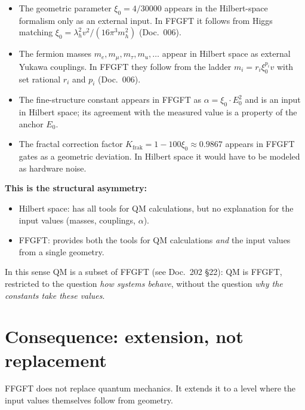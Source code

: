 \begin{itemize}[leftmargin=2em,itemsep=2pt,topsep=2pt]
  \item The geometric parameter $\xi_0 = 4/30000$ appears in the
        Hilbert-space formalism only as an external input. In FFGFT
        it follows from Higgs matching $\xi_0 = \lambda_h^2 v^2/
        (16\pi^3 m_h^2)$ (Doc.~006).
  \item The fermion masses $m_e, m_\mu, m_\tau, m_u, \ldots$ appear
        in Hilbert space as external Yukawa couplings. In FFGFT they
        follow from the ladder $m_i = r_i \xi_0^{p_i} v$ with set
        rational $r_i$ and $p_i$ (Doc.~006).
  \item The fine-structure constant appears in FFGFT as
        $\alpha = \xi_0 \cdot E_0^2$ and is an input in Hilbert
        space; its agreement with the measured value is a property of
        the anchor $E_0$.
  \item The fractal correction factor $K_{\text{frak}} = 1 -
        100\xi_0 \approx 0.9867$ appears in FFGFT gates as a
        geometric deviation. In Hilbert space it would have to be
        modeled as hardware noise.
\end{itemize}

\textbf{This is the structural asymmetry:}
\begin{itemize}[leftmargin=2em,itemsep=2pt,topsep=2pt]
  \item Hilbert space: has all tools for QM calculations, but no
        explanation for the input values (masses, couplings,
        $\alpha$).
  \item FFGFT: provides both the tools for QM calculations
        \emph{and} the input values from a single geometry.
\end{itemize}

In this sense QM is a subset of FFGFT (see Doc.~202 §22): QM is
FFGFT, restricted to the question \emph{how systems behave}, without
the question \emph{why the constants take these values}.

\section{Consequence: extension, not replacement}

FFGFT does not replace quantum mechanics. It extends it to a level
where the input values themselves follow from geometry.


